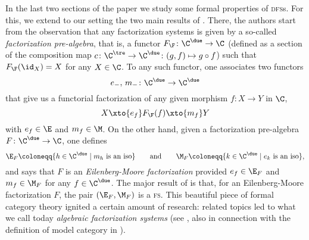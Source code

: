 In the last two sections of the paper we study some formal properties of \textsc{dfs}s. For this, we extend to our setting the two main results of \cite{Korostenski199357}. There, the authors start from the observation that any factorization systems is given by a so-called \emph{factorization pre-algebra}, that is, a functor $F_\F\colon \C^\due \to \C$ (defined as a section of the composition map $c\colon \C^\tre \to \C^\due\colon (g,f)\mapsto g\circ f$) such that $F_\F(\id_X)=X$ for any $X\in \C$. To any such functor, one associates two functors
\[
e_{-},\, m_{-}\colon \C^\due\to \C^\due
\]
that give us a functorial factorization of any given morphism $f\colon X\to Y$ in $\C$,
\[
X\xto{e_f}F_\F(f)\xto{m_f}Y
\]
with $e_f\in \E$ and $m_f\in \M$. On the other hand, given a factorization pre-algebra $F\colon \C^\due \to \C$, one defines
\[
\E_F \coloneqq \{h\in \C^\due \mid m_h\text{ is an iso}\}\qquad\text{and}\qquad
\M_F \coloneqq \{k\in \C^\due \mid e_k\text{ is an iso}\},
\]
and says that $F$ is an \emph{Eilenberg\hyp{}Moore factorization} provided $e_f\in \E_F$ and $m_f\in \M_F$ for any $f\in \C^\due$. The major result of \cite[\athm\textbf{A}]{Korostenski199357} is that, for an Eilenberg\hyp{}Moore factorization $F$, the pair $(\E_F,\M_F)$ is a \textsc{fs}. This beautiful piece of formal category theory  ignited a certain amount of research: related topics led to what we call today \emph{algebraic factorization systems} (see \cite{Gar,grandis2006natural}, also in connection with the definition of model category in \cite{riehl2011algebraic}).

